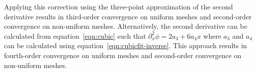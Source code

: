 \documentclass{article}
\begin{document}
Applying this correction using the three-point approximation of the second derivative results in third-order convergence on uniform meshes and second-order convergence on non-uniform meshes.  Alternatively, the second derivative can be calculated from equation~\eqref{eqn:cubic} such that $\partial_x^2 \phi = 2a_3 + 6a_4x$ where $a_3$ and $a_4$ can be calculated using equation~\eqref{eqn:cubicfit-inverse}.  This approach results in fourth-order convergence on uniform meshes and second-order convergence on non-uniform meshes.



\end{document}
